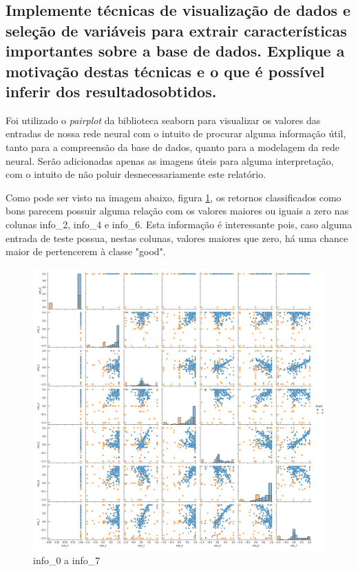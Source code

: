 \documentclass[12pt]{article}
\begin{document}
\subsection{Implemente técnicas de visualização de dados e seleção de variáveis para extrair características importantes sobre a base de dados. Explique	a motivação destas técnicas e o que é possível inferir dos resultadosobtidos.}


Foi utilizado o \textit{pairplot} da biblioteca seaborn para visualizar os valores das entradas de nossa rede neural com o intuito de procurar alguma informação útil, tanto para a compreensão da base de dados, quanto para a modelagem da rede neural. Serão adicionadas apenas as imagens úteis para alguma interpretação, com o intuito de não poluir desnecessariamente este relatório.

Como pode ser visto na imagem abaixo, figura \ref{fig:pairplot0a7}, os retornos classificados como bons parecem possuir alguma relação com os valores maiores ou iguais a zero nas colunas info\_2, info\_4 e info\_6. Esta informação é interessante pois, caso alguma entrada de teste possua, nestas colunas, valores maiores que zero, há uma chance maior de pertencerem à classe "good".

\begin{figure}[H]
	\centering
	\includegraphics[width=1.1\linewidth]{../pairplot0a7}
	\caption{info\_0 a info\_7}
	\label{fig:pairplot0a7}
\end{figure}
\end{document}

